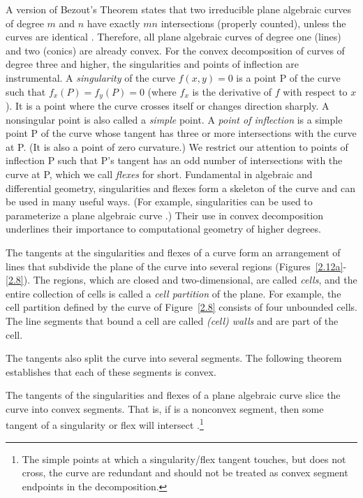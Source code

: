 A version of Bezout's Theorem states that two irreducible plane algebraic curves 
of degree $m$ and $n$ have exactly $mn$ intersections (properly counted),
unless the curves are identical \cite{walker}.
Therefore, all plane algebraic curves of degree one (lines) and two (conics) 
are already convex.
For the convex decomposition of curves of degree three and higher, the 
singularities and points of inflection are instrumental.
A {\em singularity} of the curve $f(x,y)=0$ is a point P of the curve
such that $f_{x}(P) = f_{y}(P) = 0$ (where $f_{x}$ is the derivative of $f$ with
respect to $x$).
It is a point where the curve crosses itself or changes direction sharply.
A nonsingular point is also called a {\em simple} point.
A {\em point of inflection} is a simple point P of the curve
whose tangent has three or more intersections with the curve at P.  
(It is also a point of zero curvature.)
We restrict our attention to points of inflection P such that P's tangent 
has an odd number of intersections with the curve at P, which we call
\label{restriction}
{\em flexes} for short.
Fundamental in algebraic and differential geometry, singularities and flexes
form a skeleton of the curve and can be used in many useful ways.
(For example, singularities can be used to parameterize a plane algebraic curve 
\cite{abba3}.)
Their use in convex decomposition underlines their importance to
computational geometry of higher degrees.

The tangents at the singularities and flexes of a curve form an arrangement 
of lines that subdivide the plane of the curve into several regions 
(Figures~\ref{2.12a}-\ref{2.8}).
The regions, which are closed and two-dimensional, are called {\em cells},
and the entire collection of cells is called a {\em cell partition} of the plane.
For example, the cell partition defined by the curve of Figure~\ref{2.8} consists of
four unbounded cells.
The line segments that bound a cell are called {\em (cell) walls} and are part of the
cell.

The tangents also split the curve into several segments.
The following theorem establishes that each of these segments is convex.


\clearpage

\begin{theorem}
\label{deke}
The tangents of the singularities and flexes of a plane algebraic curve slice
the curve into convex segments.  That is, if  is a nonconvex 
segment, then some tangent of a singularity or flex will intersect 
.\footnote{The simple points at which a singularity/flex 
	tangent touches, but does not cross, the curve are redundant and should 
	not be treated as convex segment endpoints in the decomposition.}
\end{theorem}
%
%
%
\ifFull
{}

